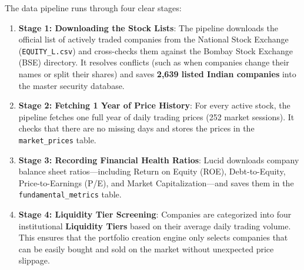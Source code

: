 The data pipeline runs through four clear stages:
\begin{enumerate}
    \item \textbf{Stage 1: Downloading the Stock Lists}: The pipeline downloads the official list of actively traded companies from the National Stock Exchange (\texttt{EQUITY\_L.csv}) and cross-checks them against the Bombay Stock Exchange (BSE) directory. It resolves conflicts (such as when companies change their names or split their shares) and saves \textbf{2,639 listed Indian companies} into the master security database.
    \item \textbf{Stage 2: Fetching 1 Year of Price History}: For every active stock, the pipeline fetches one full year of daily trading prices (252 market sessions). It checks that there are no missing days and stores the prices in the \texttt{market\_prices} table.
    \item \textbf{Stage 3: Recording Financial Health Ratios}: Lucid downloads company balance sheet ratios—including Return on Equity (ROE), Debt-to-Equity, Price-to-Earnings (P/E), and Market Capitalization—and saves them in the \texttt{fundamental\_metrics} table.
    \item \textbf{Stage 4: Liquidity Tier Screening}: Companies are categorized into four institutional \textbf{Liquidity Tiers} based on their average daily trading volume. This ensures that the portfolio creation engine only selects companies that can be easily bought and sold on the market without unexpected price slippage.
\end{enumerate}

